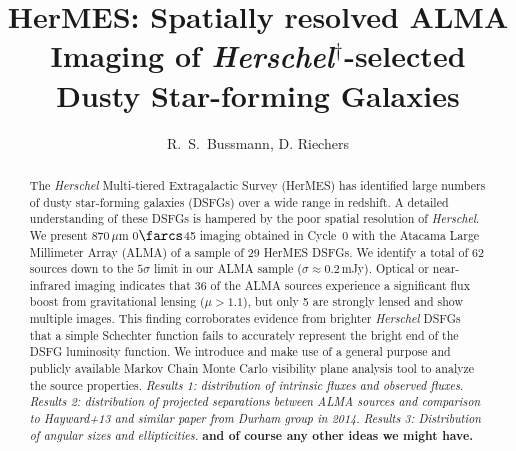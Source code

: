 \documentclass[iop]{emulateapj}
\begin{document}
\title{HerMES: Spatially resolved ALMA Imaging of {\it
Herschel}$^{\dagger}$-selected Dusty Star-forming Galaxies}


\author{R.~S.~Bussmann, D. Riechers}




\begin{abstract}

    The {\it Herschel} Multi-tiered Extragalactic Survey (HerMES) has
    identified large numbers of dusty star-forming galaxies (DSFGs) over a wide
    range in redshift.  A detailed understanding of these DSFGs is hampered by
    the poor spatial resolution of {\it Herschel}.  We present 870$\,\mu$m
    0$\farcs$45 imaging obtained in Cycle~0 with the Atacama Large Millimeter
    Array (ALMA) of a sample of 29 HerMES DSFGs.  We identify a total of 62
    sources down to the $5\sigma$ limit in our ALMA sample ($\sigma \approx
    0.2\,$mJy).  Optical or near-infrared imaging indicates that 36 of the ALMA
    sources experience a significant flux boost from gravitational lensing
    ($\mu > 1.1$), but only 5 are strongly lensed and show multiple images.
    This finding corroborates evidence from brighter {\it Herschel} DSFGs that
    a simple Schechter function fails to accurately represent the bright end of
    the DSFG luminosity function.  We introduce and make use of a general
    purpose and publicly available Markov Chain Monte Carlo visibility plane
    analysis tool to analyze the source properties.  {\it Results 1:
    distribution of intrinsic fluxes and observed fluxes.}  {\it Results 2:
    distribution of projected separations between ALMA sources and comparison
    to Hayward+13 and similar paper from Durham group in 2014.} {\it Results 3:
    Distribution of angular sizes and ellipticities.} {\bf and of course any
    other ideas we might have.}

\end{abstract}
\end{document}
